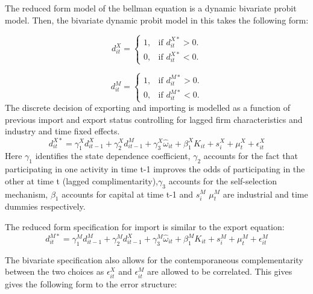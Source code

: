 \documentclass[11pt]{article}
\begin{document}
The reduced form model of the bellman equation is a dynamic bivariate
probit model.  Then, the bivariate dynamic probit model in this takes the following form:

\begin{equation}
  d_{it}^{X}=\begin{cases}
   1 , & \text{if $d_{it}^{X*}>  0$}.\\
   0 , & \text{if $d_{it}^{X*}<  0$}.
  \end{cases}
\end{equation}

\begin{equation}
  d_{it}^{M}=\begin{cases}
   1 , & \text{if $d_{it}^{M*}>  0$}.\\
   0 , & \text{if $d_{it}^{M*}<  0$}.
  \end{cases}
\end{equation}
The discrete decision of exporting and importing is modelled as a function of previous import and
export status controlling for lagged firm characteristics and industry and time fixed
effects. 
\begin{equation}
d_{it}^{X*} = \gamma_{1}^{X} d_{it-1}^{X} + \gamma_{2}^{X} d_{it-1}^{M}+
\gamma_{3}^{X} \hat{\omega}_{it}  + \beta_{1}^{X}K_{it}  +
s_{i}^{X} + \mu_{t}^{X}  + \epsilon_{it}^{X}
\end{equation}
Here $\gamma_{1}$ identifies the state dependence coefficient, $\gamma_{2}$ accounts for
the fact that participating in one activity in time t-1 improves the
odds of participating in the other at time t (lagged complimentarity),$\gamma_{3}$ accounts for
the self-selection mechanism, $\beta_{1}$ accounts for capital at time
t-1 and $s_{i}^{M}$  $\mu_{t}^{M}$ are industrial
and time dummies respectively.

The reduced form specification for import is similar to the export
equation:
\begin{equation}
d_{it}^{M*} = \gamma_{1}^{M} d_{it-1}^{M} + \gamma_{2}^{M} d_{it-1}^{X}+
\gamma_{3}^{M} \hat{\omega}_{it}  + \beta_{1}^{M}K_{it}  +
s_{i}^{M} + \mu_{t}^{M}  + \epsilon_{it}^{M}
\end{equation}

The bivariate specification also allows for the
contemporaneous complementarity between the two choices as
$\epsilon_{it}^{X}$ and $\epsilon_{it}^{M}$ are allowed to be
correlated. This gives gives the following form to the error
structure: 
\end{document}
